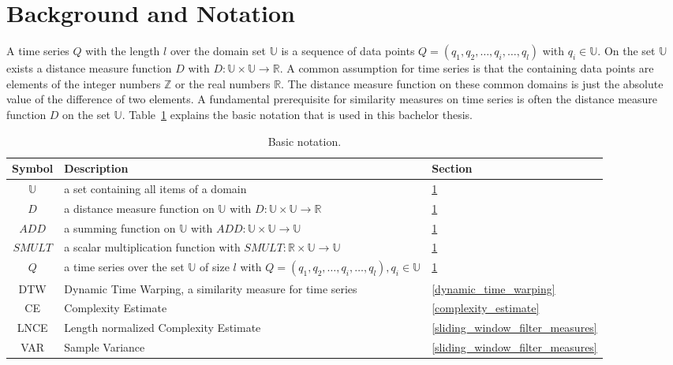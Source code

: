 \section{Background and Notation} \label{background_and_notation}
A time series $Q$ with the length $l$ over the domain set $\mathbb{U}$ is a sequence of data points
$Q = (q_1, q_2, \dots, q_i, \dots, q_l)$ with $q_i \in \mathbb{U}$. On the set $\mathbb{U}$ exists a distance measure
function $D$ with $D: \mathbb{U} \times \mathbb{U} \to \mathbb{R}$. A common assumption for time series is that the
containing data points are elements of the integer numbers $\mathbb{Z}$ or the real numbers $\mathbb{R}$. The distance
measure function on these common domains is just the absolute value of the difference of two elements. A fundamental
prerequisite for similarity measures on time series is often the distance measure function $D$ on the set
$\mathbb{U}$. Table~\ref{tab:notation} explains the basic notation that is used in this bachelor thesis.

\begin{table}
    \begin{center}
        \begin{tabularx}{\textwidth}{c X l}
            \textbf{Symbol} \qquad & \textbf{Description} & \qquad \textbf{Section}\\
            \hline
            $\mathbb{U}$ & a set containing all items of a domain & \qquad \ref{background_and_notation}\\
            $D$ & a distance measure function on $\mathbb{U}$ with $D: \mathbb{U} \times \mathbb{U} \to \mathbb{R}$
                & \qquad \ref{background_and_notation}\\
            $ADD$ & a summing function on $\mathbb{U}$ with $ADD: \mathbb{U} \times \mathbb{U} \to \mathbb{U}$
                & \qquad \ref{background_and_notation}\\
            $SMULT$ & a scalar multiplication function with $SMULT: \mathbb{R} \times \mathbb{U} \to \mathbb{U}$
                & \qquad \ref{background_and_notation}\\
            $Q$ & a time series over the set $\mathbb{U}$ of size $l$ with
                $Q = (q_1, q_2, \dots, q_i, \dots, q_l), q_i \in \mathbb{U}$ & \qquad \ref{background_and_notation}\\
            DTW & Dynamic Time Warping, a similarity measure for time series & \qquad \ref{dynamic_time_warping}\\
            CE & Complexity Estimate & \qquad \ref{complexity_estimate}\\
            LNCE & Length normalized Complexity Estimate & \qquad \ref{sliding_window_filter_measures}\\
            VAR & Sample Variance & \qquad \ref{sliding_window_filter_measures}\\
        \end{tabularx}
    \end{center}
    \caption{Basic notation.}
	\label{tab:notation}
\end{table}




